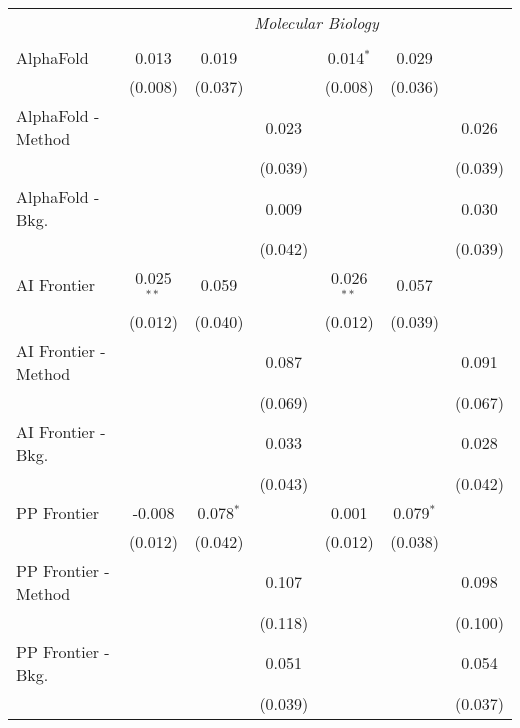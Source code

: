 \begin{tabular}{lcccccc}
 & \multicolumn{6}{c}{\textit{Molecular Biology}} \\ \\
   AlphaFold            & 0.013        & 0.019       &         & 0.014$^{*}$  & 0.029       &   \\   
                        & (0.008)      & (0.037)     &         & (0.008)      & (0.036)     &   \\   
   AlphaFold - Method   &              &             & 0.023   &              &             & 0.026\\   
                        &              &             & (0.039) &              &             & (0.039)\\   
   AlphaFold - Bkg.     &              &             & 0.009   &              &             & 0.030\\   
                        &              &             & (0.042) &              &             & (0.039)\\   
   AI Frontier          & 0.025$^{**}$ & 0.059       &         & 0.026$^{**}$ & 0.057       &   \\   
                        & (0.012)      & (0.040)     &         & (0.012)      & (0.039)     &   \\   
   AI Frontier - Method &              &             & 0.087   &              &             & 0.091\\   
                        &              &             & (0.069) &              &             & (0.067)\\   
   AI Frontier - Bkg.   &              &             & 0.033   &              &             & 0.028\\   
                        &              &             & (0.043) &              &             & (0.042)\\   
   PP Frontier          & -0.008       & 0.078$^{*}$ &         & 0.001        & 0.079$^{*}$ &   \\   
                        & (0.012)      & (0.042)     &         & (0.012)      & (0.038)     &   \\   
   PP Frontier - Method &              &             & 0.107   &              &             & 0.098\\   
                        &              &             & (0.118) &              &             & (0.100)\\   
   PP Frontier - Bkg.   &              &             & 0.051   &              &             & 0.054\\   
                        &              &             & (0.039) &              &             & (0.037)\\   

\end{tabular}
